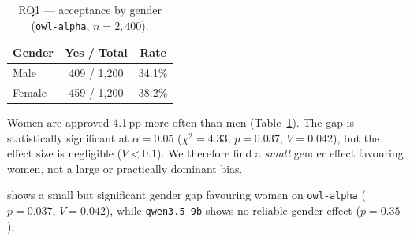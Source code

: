 \begin{table}[t]
  \centering
  \caption{RQ1 --- acceptance by gender (\texttt{owl-alpha}, $n=2{,}400$).}
  \label{tab:rq1-gender}
  \begin{tabular}{lcc}
    \toprule
    Gender & Yes / Total & Rate \\
    \midrule
    Male   & 409 / 1{,}200 & 34.1\% \\
    Female & 459 / 1{,}200 & 38.2\% \\
    \bottomrule
  \end{tabular}
\end{table}

Women are approved 4.1\,pp more often than men (Table~\ref{tab:rq1-gender}).
The gap is statistically significant at $\alpha=0.05$ ($\chi^2=4.33$, $p=0.037$, $V=0.042$), but the effect size is negligible ($V<0.1$).
We therefore find a \emph{small} gender effect favouring women, not a large or practically dominant bias.

shows a small but significant gender gap favouring women on \texttt{owl-alpha} ($p=0.037$, $V=0.042$), while \texttt{qwen3.5-9b} shows no reliable gender effect ($p=0.35$);